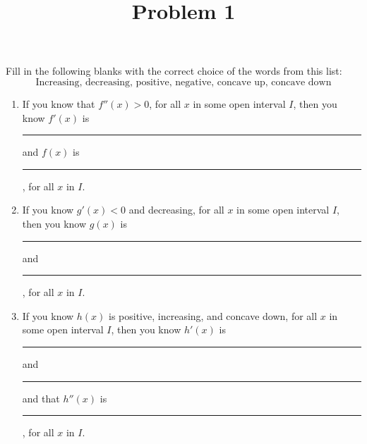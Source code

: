 \documentclass{ximera}
\title[Problem 1]{Problem 1}
\begin{document}
\begin{abstract} \end{abstract}
\maketitle

\begin{problem}
Fill in the following blanks with the correct choice of the words from this list:
$$ \text{Increasing, decreasing, positive, negative, concave up, concave down} $$

	\begin{enumerate}
	
	\item  If you know  that  $f''(x) > 0$, for all $x$ in some open interval $I$, then you know $f'(x)$ is \rule{2in}{0.7mm} 
	and $f(x)$ is \rule{2in}{0.7mm}, for all $x$ in $I$.
	\item  If you know $g'(x) < 0$ and decreasing, for all $x$ in some open interval $I$, then you know 
	$g(x)$ is \rule{2in}{0.7mm} and \rule{2in}{0.7mm}, for all $x$ in $I$.
	\item  If you know $h(x)$ is positive, increasing, and concave down, for all $x$ in some open interval $I$, then you know 
	$h'(x)$ is \rule{2in}{0.7mm} and \rule{2in}{0.7mm} and that 
	$h''(x)$ is \rule{2in}{0.7mm}, for all $x$ in $I$.
\end{enumerate}	
		
\end{problem}
\end{document}
